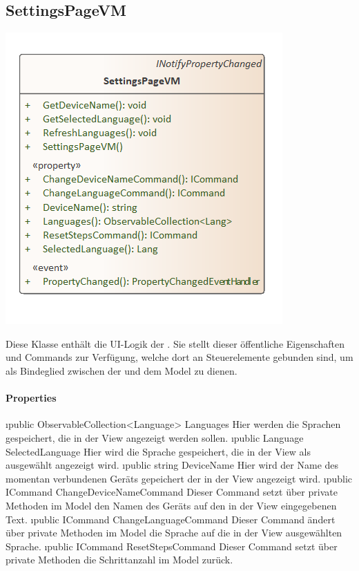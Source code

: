 \documentclass[../entwurf.tex]{subfiles}
\begin{document}
\subsection{SettingsPageVM}
\begin{minipage}{0.5\textwidth}
\includegraphics[scale=0.75]{../graphics/vm_klassen/SettingsPageVM.png}
\end{minipage}
\begin{minipage}{0.5\textwidth}
 \newline
Diese Klasse enthält die UI-Logik der . Sie stellt dieser öffentliche Eigenschaften und Commands zur Verfügung, welche dort an Steuerelemente gebunden sind, um als Bindeglied zwischen der  und dem Model zu dienen.
\end{minipage}
\paragraph{Properties}
\begin{itemize} 
	\i{public ObservableCollection<Language> Languages} Hier werden die Sprachen gespeichert, die in der View angezeigt werden sollen.
	\i{public Language SelectedLanguage} Hier wird die Sprache gespeichert, die in der View als ausgewählt angezeigt wird.
	\i{public string DeviceName} Hier wird der Name des momentan verbundenen Geräts gepeichert der in der View angezeigt wird.
	\i{public ICommand ChangeDeviceNameCommand} Dieser Command setzt über private Methoden im Model den Namen des Geräts auf den in der View eingegebenen Text. 
	\i{public ICommand ChangeLanguageCommand} Dieser Command ändert über private Methoden im Model die Sprache auf die in der View ausgewählten Sprache. 
	\i{public ICommand ResetStepsCommand} Dieser Command setzt über private Methoden die Schrittanzahl im Model zurück. 
\end{itemize}
\end{document}
